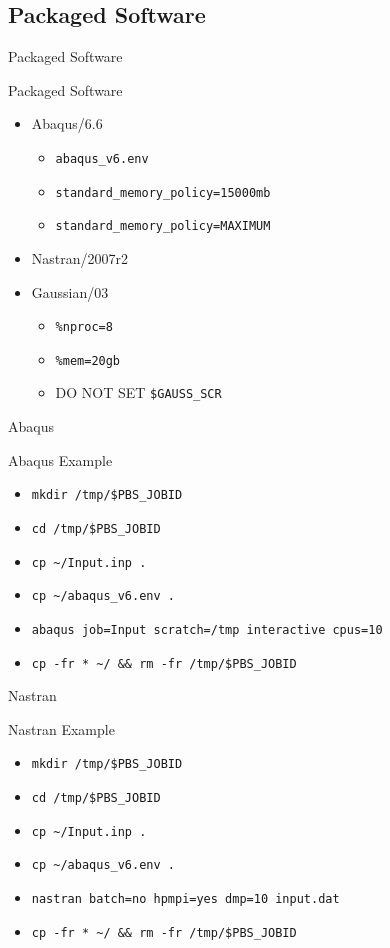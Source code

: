 \documentclass{beamer}
\begin{document}
\subsection{Packaged Software}
\begin{frame}{Packaged Software}
\begin{block}{Packaged Software}
 \begin{itemize}
  \item<1>{Abaqus/6.6}
  \begin{itemize}
   \item{\texttt{abaqus\_v6.env}}
   \item{\texttt{standard\_memory\_policy=15000mb}}
   \item{\texttt{standard\_memory\_policy=MAXIMUM}}
  \end{itemize}
  \item<2>{Nastran/2007r2}
  \item<3->{Gaussian/03}
  \begin{itemize}
   \item{\texttt{\%nproc=8}}
   \item{\texttt{\%mem=20gb}}
   \item<4->{\alert{DO NOT SET \texttt{\$GAUSS\_SCR}}}
  \end{itemize}
 \end{itemize}
\end{block}
\end{frame}
\begin{frame}{Abaqus}
\begin{block}{Abaqus Example}
  \begin{itemize}[<+-| alert@+>]
   \item{\texttt{mkdir /tmp/\$PBS\_JOBID}}
   \item{\texttt{cd /tmp/\$PBS\_JOBID}}
   \item{\texttt{cp \~{}/Input.inp .}}
   \item{\texttt{cp \~{}/abaqus\_v6.env .}}
   \item{\texttt{abaqus job=Input scratch=/tmp interactive cpus=10}}
   \item{\texttt{cp -fr * \~{}/ \&\& rm -fr /tmp/\$PBS\_JOBID}}
  \end{itemize}
\end{block}
\end{frame}
\begin{frame}{Nastran}
\begin{block}{Nastran Example}
  \begin{itemize}[<+-| alert@+>]
   \item{\texttt{mkdir /tmp/\$PBS\_JOBID}}
   \item{\texttt{cd /tmp/\$PBS\_JOBID}}
   \item{\texttt{cp \~{}/Input.inp .}}
   \item{\texttt{cp \~{}/abaqus\_v6.env .}}
   \item{\texttt{nastran batch=no hpmpi=yes dmp=10 input.dat}}
   \item{\texttt{cp -fr * \~{}/ \&\& rm -fr /tmp/\$PBS\_JOBID}}
 \end{itemize}
\end{block}
\end{frame}
\end{document}
